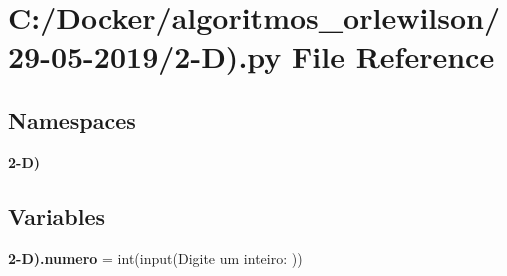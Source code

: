 \section{C\+:/\+Docker/algoritmos\+\_\+orlewilson/29-\/05-\/2019/2-\/D).py File Reference}
\label{2-_d_08_8py}
\subsection*{Namespaces}
\begin{DoxyCompactItemize}
\item 
 \textbf{ 2-\/\+D)}
\end{DoxyCompactItemize}
\subsection*{Variables}
\begin{DoxyCompactItemize}
\item 
\textbf{ 2-\/\+D).\+numero} = int(input(\textquotesingle{}Digite um inteiro\+: \textquotesingle{}))
\end{DoxyCompactItemize}
